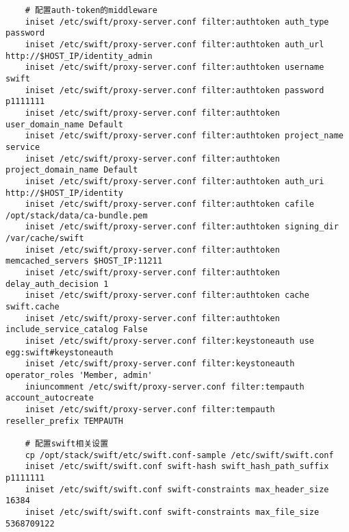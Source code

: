 \documentclass[a4paper,left=1.5cm,right=1.5cm,11pt]{article}
\begin{document}
\begin{lstlisting}
	# 配置auth-token的middleware
	iniset /etc/swift/proxy-server.conf filter:authtoken auth_type password
    iniset /etc/swift/proxy-server.conf filter:authtoken auth_url http://$HOST_IP/identity_admin
    iniset /etc/swift/proxy-server.conf filter:authtoken username swift
    iniset /etc/swift/proxy-server.conf filter:authtoken password p1111111
    iniset /etc/swift/proxy-server.conf filter:authtoken user_domain_name Default
    iniset /etc/swift/proxy-server.conf filter:authtoken project_name service
    iniset /etc/swift/proxy-server.conf filter:authtoken project_domain_name Default
    iniset /etc/swift/proxy-server.conf filter:authtoken auth_uri http://$HOST_IP/identity
    iniset /etc/swift/proxy-server.conf filter:authtoken cafile /opt/stack/data/ca-bundle.pem
    iniset /etc/swift/proxy-server.conf filter:authtoken signing_dir /var/cache/swift
    iniset /etc/swift/proxy-server.conf filter:authtoken memcached_servers $HOST_IP:11211
    iniset /etc/swift/proxy-server.conf filter:authtoken delay_auth_decision 1
    iniset /etc/swift/proxy-server.conf filter:authtoken cache swift.cache
    iniset /etc/swift/proxy-server.conf filter:authtoken include_service_catalog False
    iniset /etc/swift/proxy-server.conf filter:keystoneauth use egg:swift#keystoneauth
    iniset /etc/swift/proxy-server.conf filter:keystoneauth operator_roles 'Member, admin'
    iniuncomment /etc/swift/proxy-server.conf filter:tempauth account_autocreate
    iniset /etc/swift/proxy-server.conf filter:tempauth reseller_prefix TEMPAUTH

	# 配置swift相关设置
	cp /opt/stack/swift/etc/swift.conf-sample /etc/swift/swift.conf
    iniset /etc/swift/swift.conf swift-hash swift_hash_path_suffix p1111111
    iniset /etc/swift/swift.conf swift-constraints max_header_size 16384
    iniset /etc/swift/swift.conf swift-constraints max_file_size 5368709122


\end{lstlisting}
\end{document}
